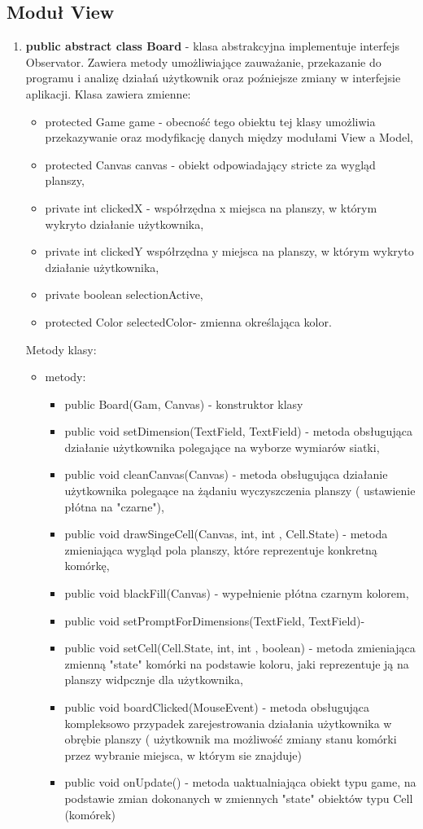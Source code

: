 \documentclass[10pt, oneside]{article}
\begin{document}
\subsection {Moduł View}
\begin {enumerate}
	\item\textbf { public abstract class Board} - klasa abstrakcyjna implementuje interfejs Observator. Zawiera metody umożliwiające zauważanie, przekazanie do programu i  analizę działań 				użytkownik oraz poźniejsze zmiany w interfejsie aplikacji. Klasa zawiera zmienne:
	\begin {itemize} 
	\item protected Game game - obecność tego obiektu tej klasy umożliwia przekazywanie oraz modyfikację danych między modułami View a Model,
	\item protected Canvas canvas - obiekt odpowiadający stricte za wygląd planszy,
	\item private int clickedX - współrzędna x miejsca na planszy, w którym wykryto działanie użytkownika,
	\item private int clickedY współrzędna y miejsca na planszy, w którym wykryto działanie użytkownika,
	\item private boolean selectionActive,
	\item protected Color selectedColor- zmienna określająca kolor.
	\end{itemize}

	Metody klasy:
\begin {itemize}
	\item metody:
	\begin{itemize}
	\item public Board(Gam, Canvas) - konstruktor klasy
	\item public void setDimension(TextField, TextField) - metoda obsługująca działanie użytkownika polegające na wyborze wymiarów siatki,
	\item public void cleanCanvas(Canvas) - metoda  obsługująca działanie użytkownika polegaące na żądaniu wyczyszczenia planszy ( ustawienie płótna na "czarne"),
	\item public void drawSingeCell(Canvas, int, int , Cell.State) - metoda zmieniająca wygląd pola planszy, które reprezentuje konkretną komórkę,
	\item public void blackFill(Canvas) - wypełnienie płótna czarnym kolorem,
	\item public void setPromptForDimensions(TextField, TextField)-
	\item public void setCell(Cell.State, int, int , boolean) - metoda zmieniająca zmienną "state" komórki na podstawie koloru, jaki reprezentuje ją na planszy widpcznje dla użytkownika,
	\item public void boardClicked(MouseEvent) - metoda obsługująca kompleksowo przypadek zarejestrowania działania użytkownika w obrębie planszy ( użytkownik ma możliwość zmiany stanu komórki przez wybranie miejsca, w którym sie znajduje)
	\item public void onUpdate()  - metoda uaktualniająca obiekt typu game, na podstawie zmian dokonanych w zmiennych "state" obiektów typu Cell (komórek)
	\end {itemize}
	

\end{itemize}
\end{enumerate}
\end{document}
